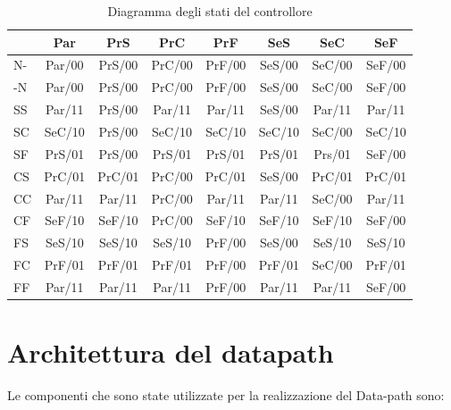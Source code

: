 \documentclass[a4paper]{article}
\begin{document}
\begin{table}[H]
	\begin{center}
		\begin{tabular}{l|c|c|c|c|c|c|c}
			   & Par    & PrS    & PrC    & PrF    & SeS    & SeC    & SeF    \\
			\hline
			N- & Par/00 & PrS/00 & PrC/00 & PrF/00 & SeS/00 & SeC/00 & SeF/00 \\
			\hline
			-N & Par/00 & PrS/00 & PrC/00 & PrF/00 & SeS/00 & SeC/00 & SeF/00 \\
			\hline
			SS & Par/11 & PrS/00 & Par/11 & Par/11 & SeS/00 & Par/11 & Par/11 \\
			\hline
			SC & SeC/10 & PrS/00 & SeC/10 & SeC/10 & SeC/10 & SeC/00 & SeC/10 \\
			\hline
			SF & PrS/01 & PrS/00 & PrS/01 & PrS/01 & PrS/01 & Prs/01 & SeF/00 \\
			\hline
			CS & PrC/01 & PrC/01 & PrC/00 & PrC/01 & SeS/00 & PrC/01 & PrC/01 \\
			\hline
			CC & Par/11 & Par/11 & PrC/00 & Par/11 & Par/11 & SeC/00 & Par/11 \\
			\hline
			CF & SeF/10 & SeF/10 & PrC/00 & SeF/10 & SeF/10 & SeF/10 & SeF/00 \\
			\hline
			FS & SeS/10 & SeS/10 & SeS/10 & PrF/00 & SeS/00 & SeS/10 & SeS/10 \\
			\hline
			FC & PrF/01 & PrF/01 & PrF/01 & PrF/00 & PrF/01 & SeC/00 & PrF/01 \\
			\hline
			FF & Par/11 & Par/11 & Par/11 & PrF/00 & Par/11 & Par/11 & SeF/00 \\
			\hline
		\end{tabular}
	\end{center}
	\caption{Diagramma degli stati del controllore}
\end{table}


\section{Architettura del datapath}
Le componenti che sono state utilizzate per la realizzazione del Data-path sono:
\end{document}
